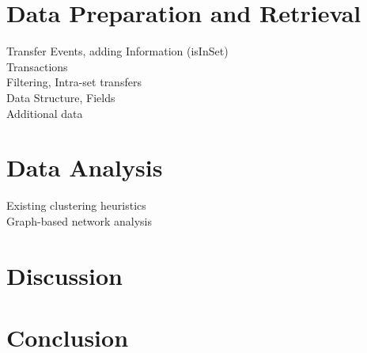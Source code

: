 \documentclass[12pt,a4paper,titlepage,oneside,english]{article}
\begin{document}

\section{Data Preparation and Retrieval}

Transfer Events, adding Information (isInSet) \\
Transactions \\
Filtering, Intra-set transfers\\
Data Structure, Fields \\
Additional data \\



\section{Data Analysis}
Existing clustering heuristics \\
Graph-based network analysis\\



\section{Discussion}




\section{Conclusion}




\newpage
\setcounter{page}{1}
\onehalfspacing
{}



\end{document}
